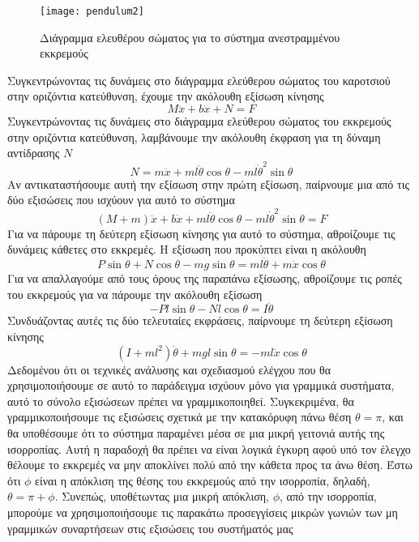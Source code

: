 \begin{figure}[h]
  \centering
  \texttt{[image: pendulum2]}
  \caption{Διάγραμμα ελευθέρου σώματος για το σύστημα ανεστραμμένου εκκρεμούς}
  \label{fig:pendulum2}
\end{figure}

Συγκεντρώνοντας τις δυνάμεις στο διάγραμμα ελεύθερου σώματος του καροτσιού στην οριζόντια κατεύθυνση, έχουμε την ακόλουθη εξίσωση κίνησης
\begin{equation}
M\ddot{x} + b\dot{x} + N = F
\end{equation}
Συγκεντρώνοντας τις δυνάμεις στο διάγραμμα ελεύθερου σώματος του εκκρεμούς στην οριζόντια κατεύθυνση, λαμβάνουμε την ακόλουθη έκφραση για τη δύναμη αντίδρασης $N$
\begin{equation}
N = m\ddot{x} + ml\ddot{\theta}\cos{\theta} - ml\dot{\theta}^2\sin{\theta}
\end{equation}
Αν αντικαταστήσουμε αυτή την εξίσωση στην πρώτη εξίσωση, παίρνουμε μια από τις δύο εξισώσεις που ισχύουν για αυτό το σύστημα
\begin{equation}
(M+m)\ddot{x} + b\dot{x} + ml\ddot{\theta}\cos{\theta}-ml\dot{\theta}^2\sin{\theta} = F
\end{equation}
Για να πάρουμε τη δεύτερη εξίσωση κίνησης για αυτό το σύστημα, αθροίζουμε τις δυνάμεις κάθετες στο εκκρεμές. Η εξίσωση που προκύπτει είναι η ακόλουθη
\begin{equation}
P\sin{\theta}+N\cos{\theta}-mg\sin{\theta}=ml\ddot{\theta}+m\ddot{x}\cos{\theta}
\end{equation}
Για να απαλλαγούμε από τους όρους της παραπάνω εξίσωσης, αθροίζουμε τις ροπές του εκκρεμούς για να πάρουμε την ακόλουθη εξίσωση
\begin{equation}
-Pl\sin{\theta}-Nl\cos{\theta}=I\ddot{\theta}
\end{equation}
Συνδυάζοντας αυτές τις δύο τελευταίες εκφράσεις, παίρνουμε τη δεύτερη εξίσωση κίνησης
\begin{equation}
\left(I+ml^2\right)\ddot{\theta}+mgl\sin{\theta}=-ml\ddot{x}\cos{\theta}
\end{equation}
Δεδομένου ότι οι τεχνικές ανάλυσης και σχεδιασμού ελέγχου που θα χρησιμοποιήσουμε σε αυτό το παράδειγμα ισχύουν μόνο για γραμμικά συστήματα, αυτό το σύνολο εξισώσεων πρέπει να γραμμικοποιηθεί. Συγκεκριμένα, θα γραμμικοποιήσουμε τις εξισώσεις σχετικά με την κατακόρυφη πάνω θέση $\theta=\pi$, και θα υποθέσουμε ότι το σύστημα παραμένει μέσα σε μια μικρή γειτονιά αυτής της ισορροπίας. Αυτή η παραδοχή θα πρέπει να είναι λογικά έγκυρη αφού υπό τον έλεγχο θέλουμε το εκκρεμές να μην αποκλίνει πολύ από την κάθετα προς τα άνω θέση. Έστω ότι $\phi$ είναι η απόκλιση της θέσης του εκκρεμούς από την ισορροπία, δηλαδή, $\theta=\pi+\phi$. Συνεπώς, υποθέτωντας μια μικρή απόκλιση, $\phi$, από την ισορροπία, μπορούμε να χρησιμοποιήσουμε τις παρακάτω προσεγγίσεις μικρών γωνιών των μη γραμμικών συναρτήσεων στις εξισώσεις του συστήματός μας
